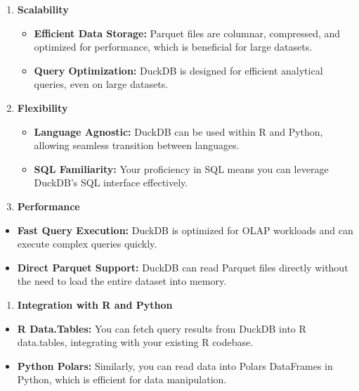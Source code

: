\documentclass[
  american,
  10,
  a4paper,
]{book}
\providecommand{\tightlist}{%
  \setlength{\itemsep}{0pt}\setlength{\parskip}{0pt}}
\theoremstyle{definition}
\theoremstyle{remark}
\begin{document}
\begin{enumerate}
\def\labelenumi{\arabic{enumi}.}
\item
  \textbf{Scalability}

  \begin{itemize}
  \tightlist
  \item
    \textbf{Efficient Data Storage:} Parquet files are columnar,
    compressed, and optimized for performance, which is beneficial for
    large datasets.
  \item
    \textbf{Query Optimization:} DuckDB is designed for efficient
    analytical queries, even on large datasets.
  \end{itemize}
\item
  \textbf{Flexibility}

  \begin{itemize}
  \tightlist
  \item
    \textbf{Language Agnostic:} DuckDB can be used within R and Python,
    allowing seamless transition between languages.
  \item
    \textbf{SQL Familiarity:} Your proficiency in SQL means you can
    leverage DuckDB's SQL interface effectively.
  \end{itemize}
\item
  \textbf{Performance}
\end{enumerate}

\begin{itemize}
\tightlist
\item
  \textbf{Fast Query Execution:} DuckDB is optimized for OLAP workloads
  and can execute complex queries quickly.
\item
  \textbf{Direct Parquet Support:} DuckDB can read Parquet files
  directly without the need to load the entire dataset into memory.
\end{itemize}

\begin{enumerate}
\def\labelenumi{\arabic{enumi}.}
\setcounter{enumi}{3}
\tightlist
\item
  \textbf{Integration with R and Python}
\end{enumerate}

\begin{itemize}
\tightlist
\item
  \textbf{R Data.Tables:} You can fetch query results from DuckDB into R
  data.tables, integrating with your existing R codebase.
\item
  \textbf{Python Polars:} Similarly, you can read data into Polars
  DataFrames in Python, which is efficient for data manipulation.
\end{itemize}
\end{document}

